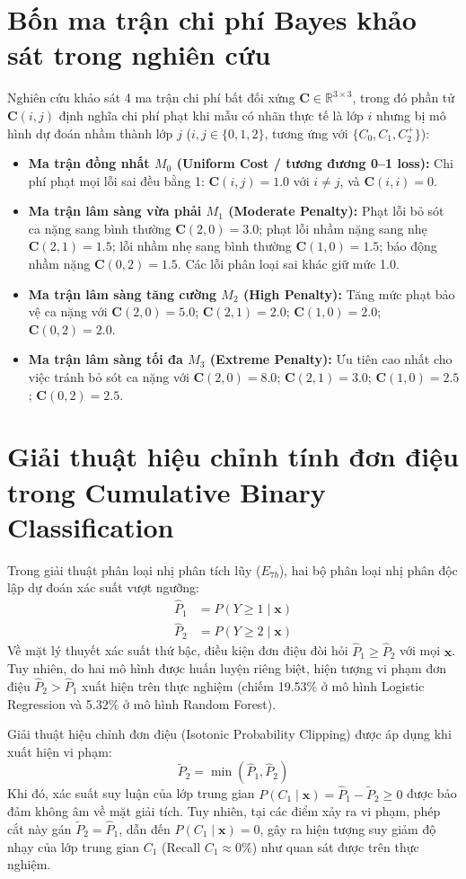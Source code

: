 \section{Bốn ma trận chi phí Bayes khảo sát trong nghiên cứu}
Nghiên cứu khảo sát 4 ma trận chi phí bất đối xứng $\mathbf{C} \in \mathbb{R}^{3 \times 3}$, trong đó phần tử $\mathbf{C}(i, j)$ định nghĩa chi phí phạt khi mẫu có nhãn thực tế là lớp $i$ nhưng bị mô hình dự đoán nhầm thành lớp $j$ ($i, j \in \{0, 1, 2\}$, tương ứng với $\{C_0, C_1, C_2^+\}$):
\begin{itemize}
    \item \textbf{Ma trận đồng nhất $M_0$ (Uniform Cost / tương đương 0--1 loss):} Chi phí phạt mọi lỗi sai đều bằng 1: $\mathbf{C}(i, j) = 1.0$ với $i \ne j$, và $\mathbf{C}(i, i) = 0$.
    \item \textbf{Ma trận lâm sàng vừa phải $M_1$ (Moderate Penalty):} Phạt lỗi bỏ sót ca nặng sang bình thường $\mathbf{C}(2, 0) = 3.0$; phạt lỗi nhầm nặng sang nhẹ $\mathbf{C}(2, 1) = 1.5$; lỗi nhầm nhẹ sang bình thường $\mathbf{C}(1, 0) = 1.5$; báo động nhầm nặng $\mathbf{C}(0, 2) = 1.5$. Các lỗi phân loại sai khác giữ mức 1.0.
    \item \textbf{Ma trận lâm sàng tăng cường $M_2$ (High Penalty):} Tăng mức phạt bảo vệ ca nặng với $\mathbf{C}(2, 0) = 5.0$; $\mathbf{C}(2, 1) = 2.0$; $\mathbf{C}(1, 0) = 2.0$; $\mathbf{C}(0, 2) = 2.0$.
    \item \textbf{Ma trận lâm sàng tối đa $M_3$ (Extreme Penalty):} Ưu tiên cao nhất cho việc tránh bỏ sót ca nặng với $\mathbf{C}(2, 0) = 8.0$; $\mathbf{C}(2, 1) = 3.0$; $\mathbf{C}(1, 0) = 2.5$; $\mathbf{C}(0, 2) = 2.5$.
\end{itemize}

\section{Giải thuật hiệu chỉnh tính đơn điệu trong Cumulative Binary Classification}
Trong giải thuật phân loại nhị phân tích lũy ($E_{7b}$), hai bộ phân loại nhị phân độc lập dự đoán xác suất vượt ngưỡng:
\begin{align}
    \hat{P}_1 &= P(Y \ge 1 \mid \mathbf{x}) \\
    \hat{P}_2 &= P(Y \ge 2 \mid \mathbf{x})
\end{align}
Về mặt lý thuyết xác suất thứ bậc, điều kiện đơn điệu đòi hỏi $\hat{P}_1 \ge \hat{P}_2$ với mọi $\mathbf{x}$. Tuy nhiên, do hai mô hình được huấn luyện riêng biệt, hiện tượng vi phạm đơn điệu $\hat{P}_2 > \hat{P}_1$ xuất hiện trên thực nghiệm (chiếm 19.53\% ở mô hình Logistic Regression và 5.32\% ở mô hình Random Forest). 

Giải thuật hiệu chỉnh đơn điệu (Isotonic Probability Clipping) được áp dụng khi xuất hiện vi phạm:
\begin{equation}
    \tilde{P}_2 = \min\left(\hat{P}_1, \hat{P}_2\right)
\end{equation}
Khi đó, xác suất suy luận của lớp trung gian $P(C_1 \mid \mathbf{x}) = \hat{P}_1 - \tilde{P}_2 \ge 0$ được bảo đảm không âm về mặt giải tích. Tuy nhiên, tại các điểm xảy ra vi phạm, phép cắt này gán $\tilde{P}_2 = \hat{P}_1$, dẫn đến $P(C_1 \mid \mathbf{x}) = 0$, gây ra hiện tượng suy giảm độ nhạy của lớp trung gian $C_1$ (Recall $C_1 \approx 0\%$) như quan sát được trên thực nghiệm.
